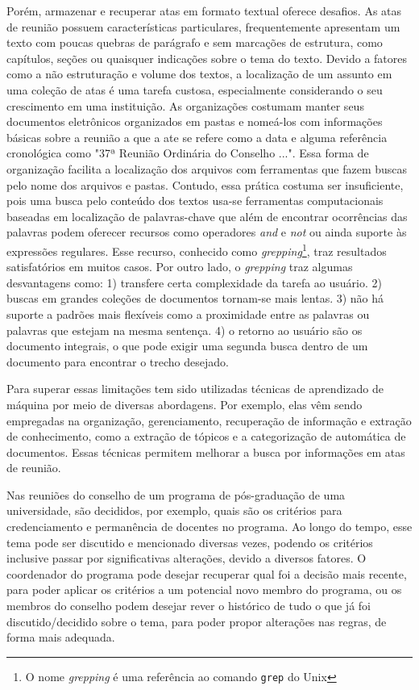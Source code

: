 Porém, armazenar e recuperar atas em formato textual oferece desafios. As atas de reunião possuem características particulares, frequentemente apresentam um texto com poucas quebras de parágrafo e sem marcações de estrutura, como capítulos, seções ou quaisquer indicações sobre o tema do texto. Devido a fatores como a não estruturação e volume dos textos, a localização de um assunto em uma coleção de atas é uma tarefa custosa, especialmente considerando o seu crescimento em uma instituição. 
As organizações costumam manter seus documentos eletrônicos organizados em pastas e nomeá-los com informações básicas sobre a reunião a que a ate se refere como a data e alguma referência cronológica como "37ª Reunião Ordinária do Conselho ...". Essa forma de organização facilita a localização dos arquivos com ferramentas que fazem buscas pelo nome dos arquivos e pastas. Contudo, essa prática costuma ser insuficiente, pois uma busca pelo conteúdo dos textos usa-se ferramentas computacionais baseadas em localização de palavras-chave que além de encontrar ocorrências das palavras podem oferecer recursos como operadores \textit{and} e \textit{not} ou ainda suporte às expressões regulares. Esse recurso, conhecido como \textit{grepping}\footnote{O nome \textit{grepping} é uma referência ao comando \texttt{grep} do Unix}, traz resultados satisfatórios em muitos casos. Por outro lado, o \textit{grepping} traz algumas desvantagens como: 1) transfere certa complexidade da tarefa ao usuário. 2) buscas em grandes coleções de documentos tornam-se mais lentas. 3) não há suporte a padrões mais flexíveis como a proximidade entre as palavras ou palavras que estejam na mesma sentença. 4) o retorno ao usuário são os documento integrais, o que pode exigir uma segunda busca dentro de um documento para encontrar o trecho desejado. 

Para superar essas limitações tem sido utilizadas técnicas de aprendizado de máquina por meio de diversas abordagens. Por exemplo, elas  vêm sendo empregadas na organização, gerenciamento, recuperação de informação e extração de conhecimento, como a extração de tópicos e a categorização de automática de documentos. Essas técnicas permitem melhorar a busca por informações em atas de reunião. 



Nas reuniões do conselho de um programa de pós-graduação de uma universidade, são decididos, por exemplo, quais são os critérios para credenciamento e permanência de docentes no programa. Ao longo do tempo, esse tema pode ser discutido e mencionado diversas vezes, podendo os critérios inclusive passar por significativas alterações, devido a diversos fatores. O coordenador do programa pode desejar recuperar qual foi a decisão mais recente, para poder aplicar os critérios a um potencial novo membro do programa, ou os membros do conselho podem desejar rever o histórico de tudo o que já foi discutido/decidido sobre o tema, para poder propor alterações nas regras, de forma mais adequada.



